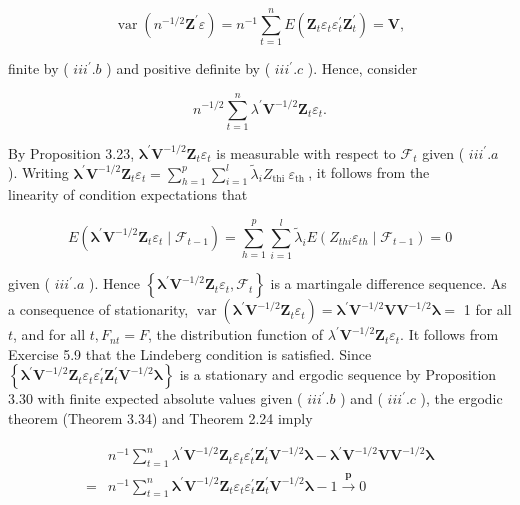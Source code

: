 \documentclass[10pt]{article}
\begin{document}
$$
\operatorname{var}\left(n^{-1 / 2} \mathbf{Z}^{\prime} \varepsilon\right)=n^{-1} \sum_{t=1}^{n} E\left(\mathbf{Z}_{t} \varepsilon_{t} \varepsilon_{t}^{\prime} \mathbf{Z}_{t}^{\prime}\right)=\mathbf{V},
$$

finite by ( $i i i^{\prime} . b$ ) and positive definite by ( $i i i^{\prime} . c$ ). Hence, consider

$$
n^{-1 / 2} \sum_{t=1}^{n} \lambda^{\prime} \mathbf{V}^{-1 / 2} \mathbf{Z}_{t} \varepsilon_{t} .
$$

By Proposition 3.23, $\boldsymbol{\lambda}^{\prime} \mathbf{V}^{-1 / 2} \mathbf{Z}_{t} \varepsilon_{t}$ is measurable with respect to $\mathcal{F}_{t}$ given ( $i i i^{\prime} . a$ ). Writing $\boldsymbol{\lambda}^{\prime} \mathbf{V}^{-1 / 2} \mathbf{Z}_{t} \varepsilon_{t}=\sum_{h=1}^{p} \sum_{i=1}^{l} \tilde{\lambda}_{i} Z_{\text {thi }} \varepsilon_{\text {th }}$, it follows from the\\
linearity of condition expectations that

$$
E\left(\boldsymbol{\lambda}^{\prime} \mathbf{V}^{-1 / 2} \mathbf{Z}_{t} \varepsilon_{t} \mid \mathcal{F}_{t-1}\right)=\sum_{h=1}^{p} \sum_{i=1}^{l} \tilde{\lambda}_{i} E\left(Z_{t h i} \varepsilon_{t h} \mid \mathcal{F}_{t-1}\right)=0
$$

given ( $i i i^{\prime} . a$ ). Hence $\left\{\boldsymbol{\lambda}^{\prime} \mathbf{V}^{-1 / 2} \mathbf{Z}_{t} \varepsilon_{t}, \mathcal{F}_{t}\right\}$ is a martingale difference sequence. As a consequence of stationarity, $\operatorname{var}\left(\boldsymbol{\lambda}^{\prime} \mathbf{V}^{-1 / 2} \mathbf{Z}_{t} \varepsilon_{t}\right)=\boldsymbol{\lambda}^{\prime} \mathbf{V}^{-1 / 2} \mathbf{V} \mathbf{V}^{-1 / 2} \boldsymbol{\lambda}=$ 1 for all $t$, and for all $t, F_{n t}=F$, the distribution function of $\lambda^{\prime} \mathbf{V}^{-1 / 2} \mathbf{Z}_{t} \varepsilon_{t}$. It follows from Exercise 5.9 that the Lindeberg condition is satisfied. Since $\left\{\boldsymbol{\lambda}^{\prime} \mathbf{V}^{-1 / 2} \mathbf{Z}_{t} \varepsilon_{t} \varepsilon_{t}^{\prime} \mathbf{Z}_{t}^{\prime} \mathbf{V}^{-1 / 2} \boldsymbol{\lambda}\right\}$ is a stationary and ergodic sequence by Proposition 3.30 with finite expected absolute values given ( $i i i^{\prime} . b$ ) and ( $i i i^{\prime} . c$ ), the ergodic theorem (Theorem 3.34) and Theorem 2.24 imply

$$
\begin{aligned}
& n^{-1} \sum_{t=1}^{n} \lambda^{\prime} \mathbf{V}^{-1 / 2} \mathbf{Z}_{t} \varepsilon_{t} \varepsilon_{t}^{\prime} \mathbf{Z}_{t}^{\prime} \mathbf{V}^{-1 / 2} \boldsymbol{\lambda}-\boldsymbol{\lambda}^{\prime} \mathbf{V}^{-1 / 2} \mathbf{V} \mathbf{V}^{-1 / 2} \boldsymbol{\lambda} \\
= & n^{-1} \sum_{t=1}^{n} \boldsymbol{\lambda}^{\prime} \mathbf{V}^{-1 / 2} \mathbf{Z}_{t} \varepsilon_{t} \varepsilon_{t}^{\prime} \mathbf{Z}_{t}^{\prime} \mathbf{V}^{-1 / 2} \boldsymbol{\lambda}-1 \xrightarrow{\boldsymbol{p}} 0
\end{aligned}
$$
\end{document}
